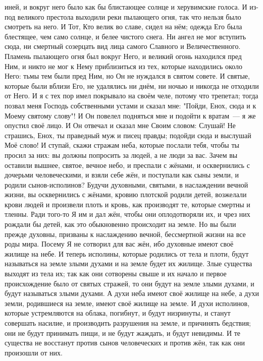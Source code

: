 иней, и вокруг него было как бы блистающее солнце и херувимские голоса.
И из-под великого престола выходили реки пылающего огня, так что
нельзя было смотреть на него.
И Тот, Кто велик во славе, сидел на нём; одежда Его была блестящее,
чем само солнце, и белее чистого снега.
Ни ангел не мог вступить сюда, ни смертный созерцать вид лица самого
Славного и Величественного.
Пламень пылающего огня был вокруг Него, и великий огонь находился
пред Ним, и никто не мог к Нему приблизиться из тех, которые находились около
Него: тьмы тем были пред Ним, но Он не нуждался в святом совете.
И святые, которые были вблизи Его, не удалялись ни днём, ни ночью и
никогда не отходили от Него.
И  я с тех пор имел покрывало на своём челе, потому что трепетал;
тогда позвал меня Господь собственными устами и сказал мне: "Пойди, Енох, сюда
и к Моему святому слову"!
И Он повелел подняться мне и подойти к вратам~--- я же опустил своё
лицо.
И Он отвечал и сказал мне Своим словом: Слушай!
Не страшись, Енох, ты праведный муж и писец правды; подойди сюда и
выслушай Моё слово!
И ступай, скажи стражам неба, которые послали тебя, чтобы ты просил
за них: вы должны попросить за людей, а не люди за вас.
Зачем вы оставили вышнее, святое, вечное небо, и преспали с жёнами,
и осквернились с дочерьми человеческими, и взяли себе жён, и поступали как сыны
земли, и родили сынов-исполинов?
Будучи духовными, святыми, в наслаждении вечной жизни, вы
осквернились с жёнами, кровию плотской родили детей, возжелали крови людей и
произвели плоть и кровь, как производят те, которые смертны и тленны.
Ради того-то Я им и дал жён, чтобы они оплодотворяли их, и чрез них
рождали бы детей, как это обыкновенно происходит на земле.
Но вы были прежде духовны, призваны к наслаждению вечной, бессмертной
жизни на все роды мира.
Посему Я не сотворил для вас жён, ибо духовные имеют своё жилище на
небе.
И теперь исполины, которые родились от тела и плоти, будут называться
на земле злыми духами и на земле будет их жилище.
Злые существа выходят из тела их; так как они сотворены свыше и их
начало и первое происхождение было от святых стражей, то они будут на земле
злыми духами, и будут называться злыми духами.
А духи неба имеют своё жилище на небе, а духи земли, родившиеся на
земле, имеют своё жилище на земле.
И духи исполинов, которые устремляются на облака, погибнут, и будут
низринуты, и станут совершать насилие, и производить разрушения на земле, и
причинять бедствия; они не будут принимать пищи, и не будут жаждать, и будут
невидимы.
И те существа не восстанут против сынов человеческих и против жён,
так как они произошли от них.
